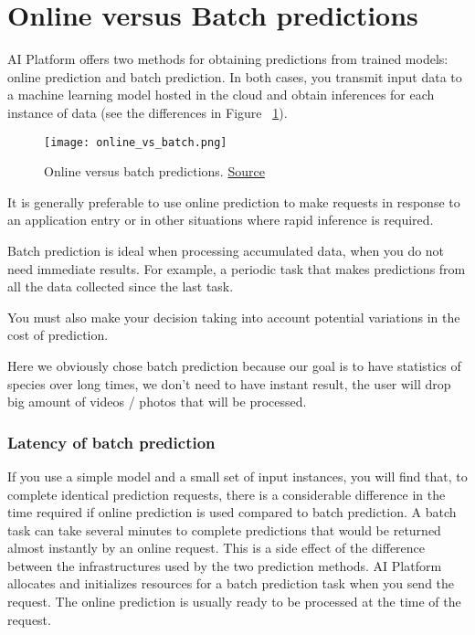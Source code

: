 \pagebreak\section{Online versus Batch predictions}
AI Platform offers two methods for obtaining predictions from trained models: online prediction and batch prediction. In both cases, you transmit input data to a machine learning model hosted in the cloud and obtain inferences for each instance of data (see the differences in Figure ~\ref{fig:onlinebatch}).

\begin{figure}[H]
    \centering
    \texttt{[image: online\_vs\_batch.png]}
	\caption{Online versus batch predictions. \href{https://cloud.google.com/ml-engine/docs/tensorflow/online-vs-batch-prediction}{Source}}
	\label{fig:onlinebatch}
\end{figure}

It is generally preferable to use online prediction to make requests in response to an application entry or in other situations where rapid inference is required.

Batch prediction is ideal when processing accumulated data, when you do not need immediate results. For example, a periodic task that makes predictions from all the data collected since the last task.

You must also make your decision taking into account potential variations in the cost of prediction.

Here we obviously chose batch prediction because our goal is to have statistics of species over long times, we don't need to have instant result, the user will drop big amount of videos / photos that will be processed.

\subsubsection{Latency of batch prediction}
If you use a simple model and a small set of input instances, you will find that, to complete identical prediction requests, there is a considerable difference in the time required if online prediction is used compared to batch prediction. A batch task can take several minutes to complete predictions that would be returned almost instantly by an online request. This is a side effect of the difference between the infrastructures used by the two prediction methods. AI Platform allocates and initializes resources for a batch prediction task when you send the request. The online prediction is usually ready to be processed at the time of the request.

